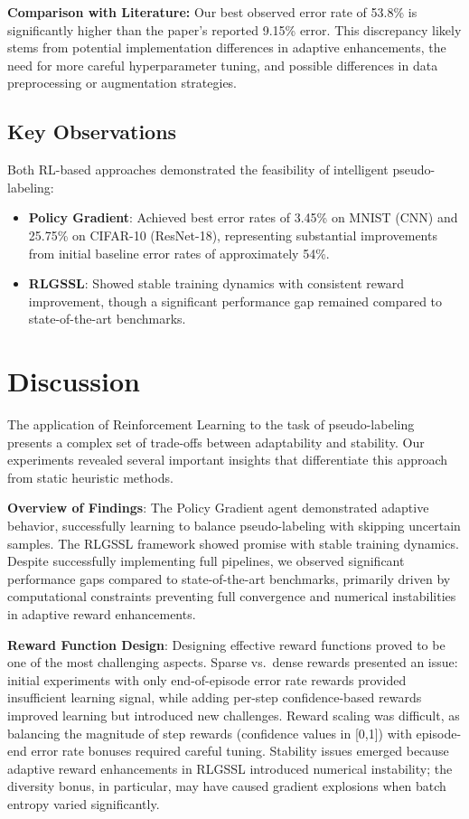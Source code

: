 \documentclass[pdflatex,sn-mathphys-num]{sn-jnl}%
\theoremstyle{thmstyleone}%
\theoremstyle{thmstyletwo}%
\theoremstyle{thmstylethree}%
\begin{document}
\textbf{Comparison with Literature:} Our best observed error rate of 53.8\% is significantly higher than the paper's reported 9.15\% error. This discrepancy likely stems from potential implementation differences in adaptive enhancements, the need for more careful hyperparameter tuning, and possible differences in data preprocessing or augmentation strategies.

\subsection{Key Observations}

Both RL-based approaches demonstrated the feasibility of intelligent pseudo-labeling:
\begin{itemize}
    \item \textbf{Policy Gradient}: Achieved best error rates of 3.45\% on MNIST (CNN) and 25.75\% on CIFAR-10 (ResNet-18), representing substantial improvements from initial baseline error rates of approximately 54\%.
    \item \textbf{RLGSSL}: Showed stable training dynamics with consistent reward improvement, though a significant performance gap remained compared to state-of-the-art benchmarks.
\end{itemize}

\section{Discussion}\label{sec:discussion}

The application of Reinforcement Learning to the task of pseudo-labeling presents a complex set of trade-offs between adaptability and stability. Our experiments revealed several important insights that differentiate this approach from static heuristic methods.

\textbf{Overview of Findings}: The Policy Gradient agent demonstrated adaptive behavior, successfully learning to balance pseudo-labeling with skipping uncertain samples. The RLGSSL framework showed promise with stable training dynamics. Despite successfully implementing full pipelines, we observed significant performance gaps compared to state-of-the-art benchmarks, primarily driven by computational constraints preventing full convergence and numerical instabilities in adaptive reward enhancements.

\textbf{Reward Function Design}: Designing effective reward functions proved to be one of the most challenging aspects. Sparse vs.\ dense rewards presented an issue: initial experiments with only end-of-episode error rate rewards provided insufficient learning signal, while adding per-step confidence-based rewards improved learning but introduced new challenges. Reward scaling was difficult, as balancing the magnitude of step rewards (confidence values in [0,1]) with episode-end error rate bonuses required careful tuning. Stability issues emerged because adaptive reward enhancements in RLGSSL introduced numerical instability; the diversity bonus, in particular, may have caused gradient explosions when batch entropy varied significantly.
\end{document}
